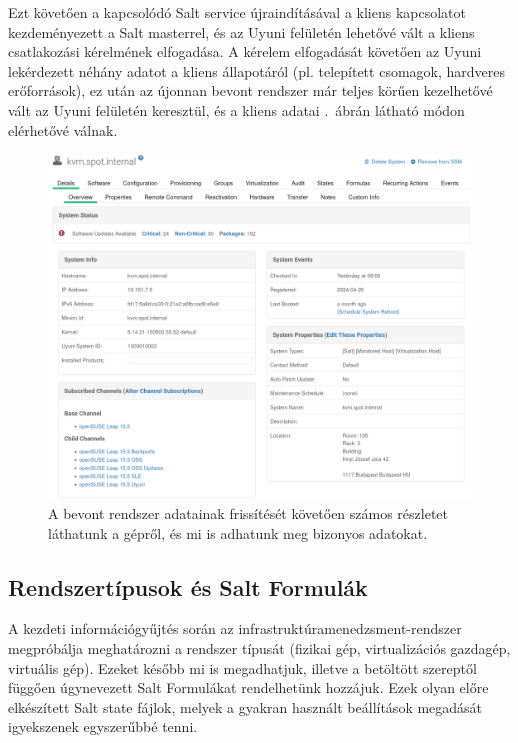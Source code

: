 Ezt követően a kapcsolódó Salt service újraindításával a kliens kapcsolatot kezdeményezett a Salt masterrel, és az Uyuni felületén lehetővé vált a kliens csatlakozási kérelmének elfogadása. A kérelem elfogadását követően az Uyuni lekérdezett néhány adatot a kliens állapotáról (pl. telepített csomagok, hardveres erőforrások), ez után az újonnan bevont rendszer már teljes körűen kezelhetővé vált az Uyuni felületén keresztül, és a kliens adatai .~ábrán látható módon elérhetővé válnak.

\begin{figure}[ht]
	\centering
	\includegraphics[width=15cm]{figures/uyuni-system-details.png}
	\caption{A bevont rendszer adatainak frissítését követően számos részletet láthatunk a gépről, és mi is adhatunk meg bizonyos adatokat.}
	\label{fig:uyuni-system-details}
\end{figure}

\subsection{Rendszertípusok és Salt Formulák}
A kezdeti információgyűjtés során az infrastruktúramenedzsment-rendszer megpróbálja meghatározni a rendszer típusát (fizikai gép, virtualizációs gazdagép, virtuális gép). Ezeket később mi is megadhatjuk, illetve a betöltött szereptől függően úgynevezett Salt Formulákat rendelhetünk hozzájuk. Ezek olyan előre elkészített Salt state fájlok, melyek a gyakran használt beállítások megadását igyekszenek egyszerűbbé tenni.

